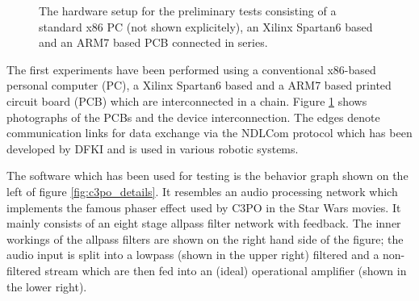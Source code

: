 \documentclass[a4paper,twocolumn]{esapub2005} %
\begin{document}
\begin{figure}[t]
\caption{
The hardware setup for the preliminary tests
consisting of a standard x86 PC (not shown explicitely), an Xilinx Spartan6 based and an ARM7 based PCB connected in series.
}
\label{fig:prelim_hw_arch}
\end{figure}

The first experiments have been performed using a conventional x86-based personal computer (PC),
a Xilinx Spartan6 based and a ARM7 based printed circuit board (PCB) which are interconnected in a chain.
Figure \ref{fig:prelim_hw_arch} shows photographs of the PCBs and the device interconnection.
The edges denote communication links for data exchange via the NDLCom protocol which has been developed by DFKI
and is used in various robotic systems.

The software which has been used for testing is the behavior graph shown on the left of figure \ref{fig:c3po_details}.
It resembles an audio processing network which implements the famous phaser effect used by C3PO in the Star Wars movies.
It mainly consists of an eight stage allpass filter network with feedback.
The inner workings of the allpass filters are shown on the right hand side of the figure;
the audio input is split into a lowpass (shown in the upper right) filtered and a non-filtered stream which are then
fed into an (ideal) operational amplifier (shown in the lower right).
\end{document}
